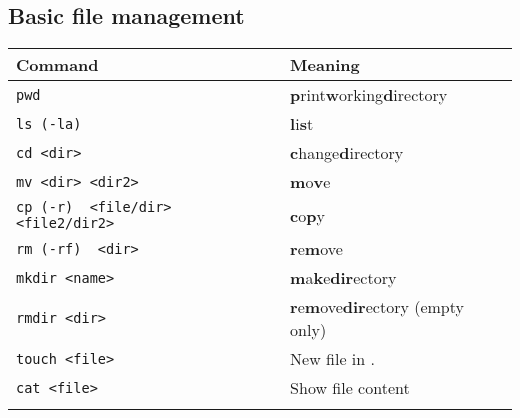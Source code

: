 \documentclass{article}
\begin{document}
\subsection{Basic file management}
\begin{minipage}{0.75\textwidth}
      \begin{table}[H]
            \begin{tabular}{ll}
                  \textbf{Command}                             & \textbf{Meaning}                               \\ \hline
                  \lstinline|pwd|                              & {\bf p}rint{\bf w}orking{\bf d}irectory        \\ \arrayrulecolor{lightgray}\hline
                  \lstinline|ls (-la)|                         & {\bf l}i{\bf s}t                               \\ \arrayrulecolor{lightgray}\hline
                  \lstinline|cd <dir>|                         & {\bf c}hange{\bf d}irectory                    \\ \arrayrulecolor{lightgray}\hline
                  \lstinline|mv <dir> <dir2>|                  & {\bf m}o{\bf v}e                               \\ \arrayrulecolor{lightgray}\hline
                  \lstinline|cp (-r)  <file/dir> <file2/dir2>| & {\bf c}o{\bf p}y                               \\ \arrayrulecolor{lightgray}\hline
                  \lstinline|rm (-rf)  <dir>|                  & {\bf r}e{\bf m}ove                             \\ \arrayrulecolor{lightgray}\hline
                  \lstinline|mkdir <name>|                     & {\bf m}a{\bf k}e{\bf dir}ectory                \\ \arrayrulecolor{lightgray}\hline
                  \lstinline|rmdir <dir>|                      & {\bf r}e{\bf m}ove{\bf dir}ectory (empty only) \\ \arrayrulecolor{lightgray}\hline
                  \lstinline|touch <file>|                     & New file in .                                  \\ \arrayrulecolor{lightgray}\hline
                  \lstinline|cat <file>|                       & Show file content                              \\ \arrayrulecolor{lightgray}\hline
            \end{tabular}
      \end{table}
\end{minipage}
\end{document}

